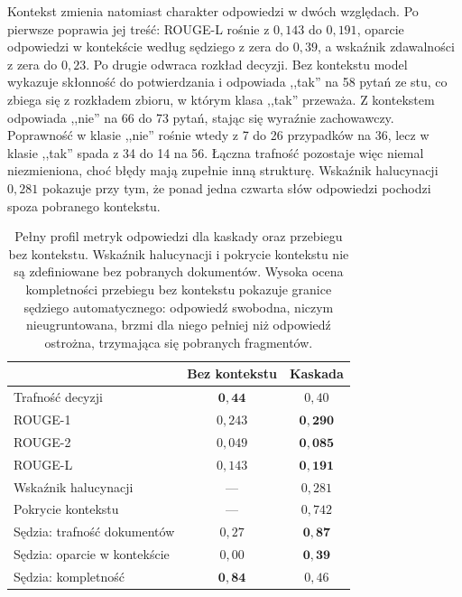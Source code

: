 Kontekst zmienia natomiast charakter odpowiedzi w dwóch względach. Po pierwsze poprawia jej
treść: ROUGE-L rośnie z $0{,}143$ do $0{,}191$, oparcie odpowiedzi w kontekście według sędziego
z zera do $0{,}39$, a wskaźnik zdawalności z zera do $0{,}23$. Po drugie odwraca rozkład
decyzji. Bez kontekstu model wykazuje skłonność do potwierdzania i odpowiada ,,tak'' na 58 pytań
ze stu, co zbiega się z rozkładem zbioru, w którym klasa ,,tak'' przeważa. Z kontekstem odpowiada
,,nie'' na 66 do 73 pytań, stając się wyraźnie zachowawczy. Poprawność w klasie ,,nie'' rośnie
wtedy z 7 do 26 przypadków na 36, lecz w klasie ,,tak'' spada z 34 do 14 na 56. Łączna trafność
pozostaje więc niemal niezmieniona, choć błędy mają zupełnie inną strukturę. Wskaźnik
halucynacji $0{,}281$ pokazuje przy tym, że
ponad jedna czwarta słów odpowiedzi pochodzi spoza pobranego kontekstu.

\begin{table}[htbp]
\centering
\small
\begin{tabular}{@{}lcc@{}}
\toprule
& \textbf{Bez kontekstu} & \textbf{Kaskada} \\
\midrule
Trafność decyzji                & $\mathbf{0{,}44}$ & $0{,}40$ \\
ROUGE-1                         & $0{,}243$ & $\mathbf{0{,}290}$ \\
ROUGE-2                         & $0{,}049$ & $\mathbf{0{,}085}$ \\
ROUGE-L                         & $0{,}143$ & $\mathbf{0{,}191}$ \\
Wskaźnik halucynacji            & ---      & $0{,}281$ \\
Pokrycie kontekstu              & ---      & $0{,}742$ \\
Sędzia: trafność dokumentów     & $0{,}27$ & $\mathbf{0{,}87}$ \\
Sędzia: oparcie w kontekście    & $0{,}00$ & $\mathbf{0{,}39}$ \\
Sędzia: kompletność             & $\mathbf{0{,}84}$ & $0{,}46$ \\
\bottomrule
\end{tabular}
\caption{Pełny profil metryk odpowiedzi dla kaskady oraz przebiegu bez kontekstu. Wskaźnik
halucynacji i pokrycie kontekstu nie są zdefiniowane bez pobranych dokumentów. Wysoka ocena
kompletności przebiegu bez kontekstu pokazuje granice sędziego automatycznego: odpowiedź
swobodna, niczym nieugruntowana, brzmi dla niego pełniej niż odpowiedź ostrożna, trzymająca się
pobranych fragmentów.}
\label{tab:generacjaProfil}
\end{table}

